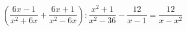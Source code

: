 \begin{ex}[type=equation]
	\begin{condition}
		$\left(\dfrac{6 x - 1}{x^2 + 6x} + \dfrac{6x + 1}{x^2 - 6x}\right) : \dfrac{x^2 +1}{x^2 - 36} - \dfrac{12}{x - 1} = \dfrac{12}{x - x^2}$
	\end{condition}
\end{ex}